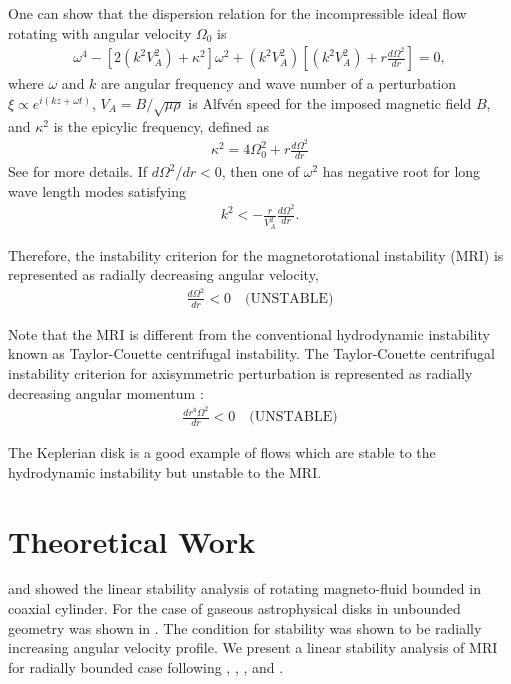 \documentclass{jfm}
\begin{document}
One can show that the dispersion relation for the incompressible ideal flow 
rotating with angular velocity $\Omega_0$ is
\begin{align}
    \omega^4-\left[2\left(k^2 V_A^2\right) +\kappa^2\right]\omega^2 +\left(k^2 V_A^2\right)\left[\left(k^2 V_A^2\right)+r\frac{d \Omega^2}{dr}\right]=0,
\end{align}
where $\omega$ and $k$ are angular frequency and wave number of a perturbation
$\xi \propto e^{i(k z+\omega t)}$, $V_A = B / \sqrt{\mu \rho}$ is Alfv\'en speed
for the imposed magnetic field $B$, and $\kappa^2$ is the epicylic frequency, 
defined as
\begin{align}
    \kappa^2=4\Omega_0^2 + r \frac{d \Omega^2}{dr}
\end{align}
See \cite{Balbus1991, Balbus1998, Balbus2003} for more details. If 
$d \Omega^2 / dr < 0$, then one of $\omega^2$ has negative root for long wave 
length modes satisfying
\begin{align}
    k^2 < -\frac{r}{V_A^2}\frac{d\Omega^2}{dr}.
\end{align}

Therefore, the instability criterion for the magnetorotational instability (MRI)
is represented as radially decreasing angular velocity,
\begin{align}
    \frac{d \Omega^2}{dr}<0 \quad \text{(UNSTABLE)}
\end{align} 

Note that the MRI is different from the conventional hydrodynamic instability 
known as Taylor-Couette centrifugal instability. The Taylor-Couette centrifugal
instability criterion for axisymmetric perturbation is represented as radially 
decreasing angular momentum \citep{Charru2011}:
\begin{align}
    \frac{d r^4 \Omega^2}{dr} <0 \quad \text{(UNSTABLE)}
\end{align}

The Keplerian disk is a good example of flows which are stable to the 
hydrodynamic instability but unstable to the MRI.



\section{Theoretical Work}
\label{sec:theory}

\cite{Acheson1973} and \cite{Knobloch1992} showed the linear stability analysis
of rotating magneto-fluid bounded in coaxial cylinder. For the case of gaseous 
astrophysical disks in unbounded geometry was shown in \cite{Balbus1991}. The 
condition for stability was shown to be radially increasing angular velocity 
profile. We present a linear stability analysis of MRI for radially bounded case 
following \cite{Acheson1972}, \cite{Acheson1973a}, \cite{Knobloch1992}, and 
\cite{Julien2010}.
\end{document}
